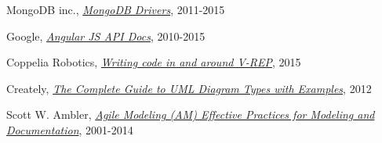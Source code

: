 \begin{thebibliography}{99}
MongoDB inc.,
\emph{\href{http://docs.mongodb.org/ecosystem/drivers/}{MongoDB Drivers}},  
2011-2015

Google,
\emph{\href{https://docs.angularjs.org/api?PHPSESSID=cae8e98e7ca559b4605d75c813b358ee}{Angular JS API Docs}},  
2010-2015

Coppelia Robotics,
\emph{\href{http://www.coppeliarobotics.com/helpFiles/en/writingCode.htm}{Writing code in and around V-REP}},  
2015

Creately,
\emph{\href{http://creately.com/blog/diagrams/uml-diagram-types-examples/}{The Complete Guide to UML Diagram Types with Examples}},  
2012

Scott W. Ambler,
\emph{\href{http://agilemodeling.com/}{Agile Modeling (AM) Effective Practices for Modeling and Documentation}},  
2001-2014

\end{thebibliography}